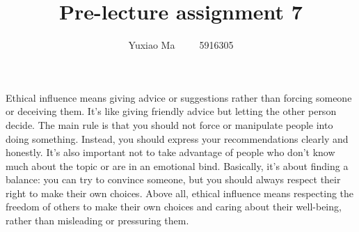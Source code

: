 \documentclass[UTF8,a4paper,AutoFakeBold,AutoFakeSlant]{article}
\title{\textbf{\textsf{{\textsf{Pre-lecture assignment 7}}}}}
\author{\tnewroman Yuxiao Ma~~~~~5916305}
\date{}
\begin{document}
\maketitle

Ethical influence means giving advice or suggestions rather than forcing someone or deceiving them. It's like giving friendly advice but letting the other person decide. The main rule is that you should not force or manipulate people into doing something. Instead, you should express your recommendations clearly and honestly. It’s also important not to take advantage of people who don’t know much about the topic or are in an emotional bind. Basically, it's about finding a balance: you can try to convince someone, but you should always respect their right to make their own choices. Above all, ethical influence means respecting the freedom of others to make their own choices and caring about their well-being, rather than misleading or pressuring them.

% 
% 
% 
\end{document}
